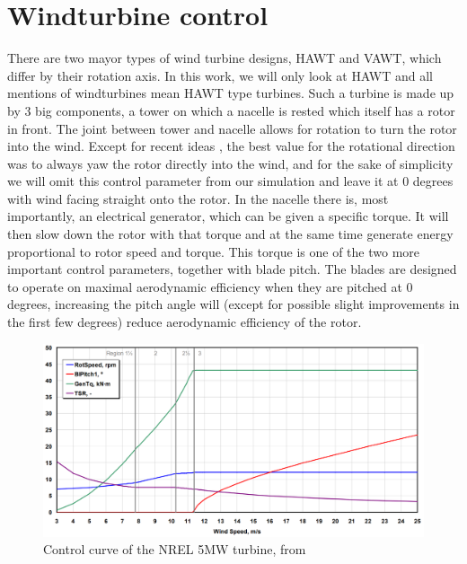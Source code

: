 \documentclass[hyperref,beleg]{cgvpub}
\begin{document}
\section{Windturbine control}
There are two mayor types of wind turbine designs, \ac{HAWT} and \ac{VAWT}, which differ by their rotation axis. In this work, we will only look at \ac{HAWT} and all mentions of windturbines mean \ac{HAWT} type turbines. Such a turbine is made up by 3 big components, a tower on which a nacelle is rested which itself has a rotor in front. 
The joint between tower and nacelle allows for rotation to turn the rotor into the wind. Except for recent ideas \cite{howlandWindFarmPower2019}, the best value for the rotational direction was to always yaw the rotor directly into the wind, and for the sake of simplicity we will omit this control parameter from our simulation and leave it at 0 degrees with wind facing straight onto the rotor.
In the nacelle there is, most importantly, an electrical generator, which can be given a specific torque. It will then slow down the rotor with that torque and at the same time generate energy proportional to rotor speed and torque. This torque is one of the two more important control parameters, together with blade pitch. The blades are designed to operate on maximal aerodynamic efficiency when they are pitched at 0 degrees, increasing the pitch angle will (except for possible slight improvements in the first few degrees) reduce aerodynamic efficiency of the rotor.

\begin{figure}
  \centering
  \includegraphics{images/NREL-5MW.png}
  \caption{Control curve of the NREL 5MW turbine, from \cite{jonkmanDefinition5MWReference2009}}
  \label{fig:nrel5mw}
\end{figure}
\end{document}
